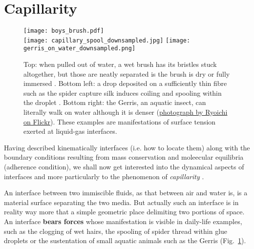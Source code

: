 \section{Capillarity}
\begin{figure}[htbp]
\begin{center}
\texttt{[image: boys\_brush.pdf]} \\
\texttt{[image: capillary\_spool\_downsampled.jpg]} \quad
\texttt{[image: gerris\_on\_water\_downsampled.png]}
\end{center}
\caption{Top: when pulled out of water, a wet brush has its bristles stuck altogether, but those are neatly separated is the brush is dry or fully immersed \citep{Boys1890}. Bottom left: a drop deposited on a sufficiently thin fibre such as the spider capture silk induces coiling and spooling within the droplet \citep{Elettro2016}. Bottom right: the Gerris, an aquatic insect, can literally walk on water although it is denser (\href{https://www.flickr.com/photos/ryoichi360/5847533955/in/photolist-9UJ97X-EU3vy-V3eJzF-8wimyD-fafpgs-HKfkdJ-22TUHgL-SWUure-dcK4vX-2baXF3n-DhVeuP-rMc5KH-253wqN-2fQ2VWT-8p2CBK-8d9rrm-VmimZt-PcW89C-283Sj59-Hvg77b-N9Ytvw-SN5EhR-cQ7gBj-s4aR9q-eDcCJz-HrEa1e-6hizYZ-Wq8cWg-FYhg7k-8874aQ-iJqVV-56yPYc-X5ffoi-pkU5Zt-p9ztvz-ZSJkzJ-ofYXjT-a9n3xT-2ekD2e9-5sAmFu-ccGJis-24KoY9K-QZW2Li-4f9Fjc-fyuZPT-Hr29p5-kLdZ8n-Tu8m9W-nQg4Lr-s85mcc}{photograph by Ryoichi on Flickr}). These examples are manifestations of surface tension exerted at liquid-gas interfaces.}
\label{fig:surface_tension}
\end{figure}
Having described kinematically interfaces (i.e. how to locate them) along with the boundary conditions resulting from mass conservation and moleecular equilibria (adherence condition), we shall now get interested into the dynamical aspects of interfaces and more particularly to the phenomenon of \textit{capillarity} \citep{de-Gennes2015}.

An interface between two immiscible fluids, as that between air and water is, is a material surface separating the two media. But actually such an interface is in reality way more that a simple geometric place delimiting two portions of space. An interface \textbf{bears forces} whose manifestation is visible in daily-life examples, such as the clogging of wet hairs, the spooling of spider thread within glue droplets or the sustentation of small aquatic animals such as the Gerris (Fig.~\ref{fig:surface_tension}).

